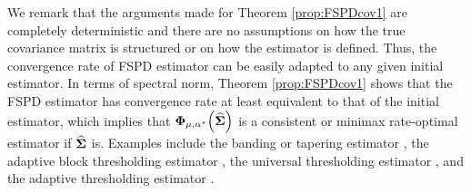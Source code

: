 \documentclass[times,sort&compress,3p]{elsarticle}
\begin{document}
We remark that 
the arguments made for Theorem \ref{prop:FSPDcov1} are completely deterministic and there are no assumptions on how the true covariance matrix is structured or on how the estimator is defined. Thus, the convergence rate of FSPD estimator can be easily adapted to any given initial estimator.
In terms of spectral norm, Theorem \ref{prop:FSPDcov1} shows that the FSPD estimator has convergence rate at least equivalent to that of the initial estimator, which implies that  ${\bf \Phi}_{\mu, \alpha^*}\Big(\widehat{\bf \Sigma}\Big)$ is a consistent or minimax rate-optimal estimator if $\widehat{\bf \Sigma}$ is. Examples include the banding or tapering estimator \citep{Cai2010},  the adaptive block thresholding estimator \citep{Cai2012c}, the universal thresholding estimator \citep{Cai2012f},  and the adaptive thresholding estimator \citep{Cai2011b}.
\end{document}
